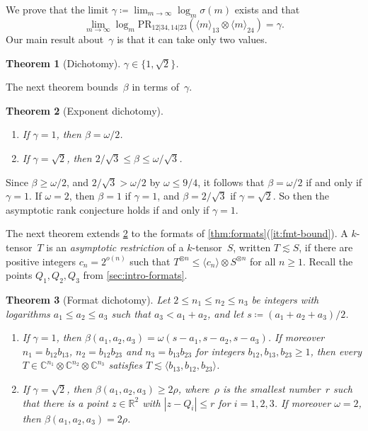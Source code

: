 \documentclass[11pt,letterpaper]{article}
\numberwithin{equation}{section}
\newtheorem{theorem}{Theorem}[section]
\theoremstyle{definition}
\newcommand{\asympleq}{\lesssim}
\newcommand{\CC}{\mathbb{C}}
\newcommand{\RR}{\mathbb{R}}
\newcommand{\PR}{\mathrm{PR}}
\begin{document}
We prove that the limit $\gamma\coloneqq\lim_{m\to\infty}\log_m\sigma(m)$ exists and that
\[
 \lim_{m\to\infty}\log_m\PR_{12|34,14|23}(\langle m\rangle_{13}\otimes\langle m\rangle_{24})=\gamma.
\]
Our main result about~$\gamma$ is that it can take only two values.

\begin{theorem}[Dichotomy]\label{thm:gap}
$\gamma\in\{1,\sqrt2\}$.
\end{theorem}

The next theorem bounds~$\beta$ in terms of~$\gamma$.

\begin{theorem}[Exponent dichotomy]\label{thm:exponent}\hfill
\begin{enumerate}[\upshape(i)]
\item\label{it:low} If $\gamma=1$, then $\beta=\omega/2$.
\item\label{it:high} If $\gamma=\sqrt2$, then $2/\sqrt3\le\beta\le\omega/\sqrt3$.
\end{enumerate}
\end{theorem}

Since $\beta\ge\omega/2$, and $2/\sqrt3>\omega/2$ by
$\omega\le9/4$, it follows that $\beta=\omega/2$
if and only if $\gamma=1$. If $\omega=2$, then $\beta=1$ if $\gamma=1$, and $\beta=2/\sqrt3$ if $\gamma=\sqrt2$. So
then the asymptotic rank conjecture holds if and only if $\gamma=1$.

The next theorem extends \cref{thm:exponent} to the formats of \cref{thm:formats}(\ref{it:fmt-bound}). A
$k$-tensor~$T$ is an \emph{asymptotic restriction} of a $k$-tensor~$S$, written $T\asympleq S$, if there are positive
integers $c_n=2^{o(n)}$ such that $T^{\otimes n}\le\langle c_n\rangle\otimes S^{\otimes n}$ for all $n\ge1$. Recall the
points $Q_1,Q_2,Q_3$ from \cref{sec:intro-formats}.

\begin{theorem}[Format dichotomy]\label{thm:formatdich}
Let $2\le n_1\le n_2\le n_3$ be integers with logarithms $a_1\le a_2\le a_3$ such that $a_3<a_1+a_2$, and let
$s\coloneqq(a_1+a_2+a_3)/2$.
\begin{enumerate}[\upshape(i)]
\item\label{it:fd-low} If $\gamma=1$, then $\beta(a_1,a_2,a_3)=\omega(s-a_1,s-a_2,s-a_3)$. If moreover
$n_1=b_{12}b_{13}$, $n_2=b_{12}b_{23}$ and $n_3=b_{13}b_{23}$ for integers $b_{12},b_{13},b_{23}\ge1$, then every
$T\in\CC^{n_1}\otimes\CC^{n_2}\otimes\CC^{n_3}$ satisfies $T\asympleq\langle b_{13},b_{12},b_{23}\rangle$.
\item\label{it:fd-high} If $\gamma=\sqrt2$, then $\beta(a_1,a_2,a_3)\ge2\rho$, where~$\rho$ is the smallest number~$r$
such that there is a point $z\in\RR^2$ with $|z-Q_i|\le r$ for $i=1,2,3$. If moreover $\omega=2$, then
$\beta(a_1,a_2,a_3)=2\rho$.
\end{enumerate}
\end{theorem}
\end{document}
